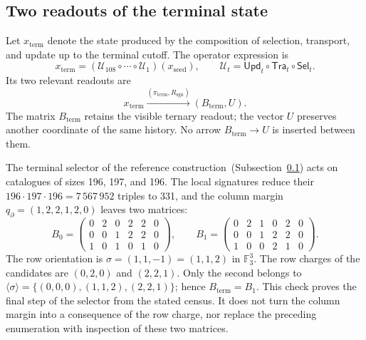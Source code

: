 

\subsection{Two readouts of the terminal state}
\label{subsec:k-terminal}

Let \(x_{\mathrm{term}}\) denote the state produced by the composition
of selection, transport, and update up to the terminal cutoff. The
operator expression is
\[
 x_{\mathrm{term}}=
 (\mathcal U_{108}\circ\cdots\circ\mathcal U_1)(x_{\mathrm{seed}}),
 \qquad \mathcal U_t=\mathsf{Upd}_t\circ\mathsf{Tra}_t\circ\mathsf{Sel}_t.
\]
Its two relevant readouts are
\[
 x_{\mathrm{term}}
 \xrightarrow{(\pi_{\mathrm{term}},R_{\mathrm{sgn}})}
 (B_{\mathrm{term}},U).
\]
The matrix \(B_{\mathrm{term}}\) retains the visible ternary readout; the
vector \(U\) preserves another coordinate of the same history. No arrow
\(B_{\mathrm{term}}\to U\) is inserted between them.

The terminal selector of the reference construction~(Subsection~\ref{subsec:k-terminal}) acts on catalogues
of sizes 196, 197, and 196. The local signatures reduce their
\(196\cdot197\cdot196=7\,567\,952\) triples to 331, and the column
margin \(q_{\partial}=(1,2,2,1,2,0)\) leaves two matrices:
\[
 B_0=\begin{pmatrix}0&2&0&2&2&0\\0&0&1&2&2&0\\1&0&1&0&1&0\end{pmatrix},
 \qquad
 B_1=\begin{pmatrix}0&2&1&0&2&0\\0&0&1&2&2&0\\1&0&0&2&1&0\end{pmatrix}.
\]
The row orientation is \(\sigma=(1,1,-1)=(1,1,2)\) in
\(\mathbb F_3^3\). The row charges of the candidates are
\((0,2,0)\) and \((2,2,1)\). Only the second belongs to
\(\langle\sigma\rangle=\{(0,0,0),(1,1,2),(2,2,1)\}\); hence
\(B_{\mathrm{term}}=B_1\). This check proves the final step of the
selector from the stated census. It does not turn the column margin
into a consequence of the row charge, nor replace the preceding enumeration
with inspection of these two matrices.

